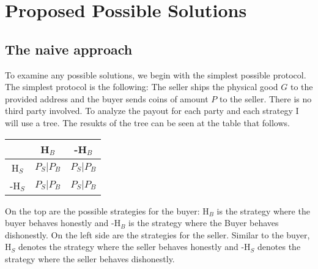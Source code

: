 \documentclass{cacthesis}
\begin{document}
\chapter{Proposed Possible Solutions}
\section{The naive approach}
To examine any possible solutions, we begin with the simplest possible protocol.\newline
The simplest protocol is the following: The seller ships the physical good $G$ to the provided address and the buyer sends coins of amount $P$ to the seller. There is no third party involved. 
To analyze the payout for each party and each strategy I will use a tree. The resukts of the tree can be seen at the table that follows.\newline

\begin{center}
\begin{tabular}{ c||c|c| }
& H$_B$ & -H$_B$  \\
\hline
\hline
H$_S$ & $P_S | P_B$ & $P_S | P_B$ \\
\hline
-H$_S$ & $P_S | P_B$ & $P_S | P_B$ \\ 
\hline
\end{tabular}
\end{center}

 On the top are the possible strategies for the buyer: H$_B$ is the strategy where the buyer behaves honestly and -H$_B$ is the strategy where the Buyer behaves dishonestly.\newline
On the left side are the strategies for the seller. Similar to the buyer, H$_S$ denotes the strategy where the seller behaves honestly and -H$_S$ denotes the strategy where the seller behaves dishonestly.\newline
\end{document}
